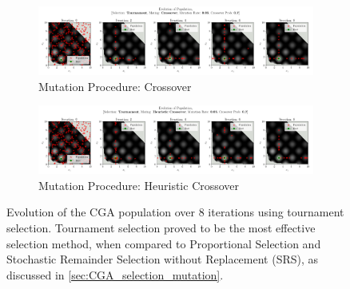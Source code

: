 \documentclass[10pt]{article}
\begin{document}
\begin{figure}[H]
    \centering
    \begin{subfigure}{0.85\textwidth}
        \centering
        \includegraphics[width=\textwidth]{../figures/KBF/10_iters/Tournament/Crossover/0.05_0.7_Population.png}
        \caption{Mutation Procedure: Crossover}
        \label{fig:CGA_flowchart_tournament_crossover}
    \end{subfigure}
    \begin{subfigure}{0.85\textwidth}
        \centering
        \includegraphics[width=\textwidth]{../figures/KBF/10_iters/Tournament/Heuristic Crossover/0.05_0.7_Population.png}
        \caption{Mutation Procedure: Heuristic Crossover}
        \label{fig:CGA_flowchart_tournament_Heuristic Crossover}
    \end{subfigure}
    \captionsetup{justification=centering}
    \caption{Evolution of the CGA population over 8 iterations using tournament selection. Tournament selection proved to be the most effective selection method, when compared to Proportional Selection and Stochastic Remainder Selection without Replacement (SRS), as discussed in \ref{sec:CGA_selection_mutation}.}
    \label{fig:CGA_flowchart_tournament}
\end{figure}
\end{document}
